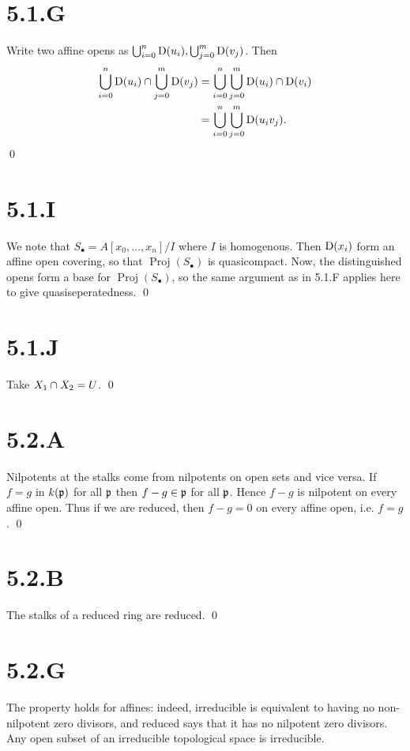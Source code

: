 \documentclass{article}
\begin{document}
\section{5.1.G}
Write two affine opens as $\bigcup_{i=0}^n \operatorname{D}(u_i), \bigcup_{j=0}^m \operatorname{D}(v_j)$. Then
\begin{align*}
    \bigcup_{i=0}^n \operatorname{D}(u_i) \cap \bigcup_{j=0}^m \operatorname{D}(v_j) & = \bigcup_{i=0}^n \bigcup_{j=0}^m \operatorname{D}(u_i) \cap \operatorname{D}(v_i) \\
                                                             & = \bigcup_{i=0}^n \bigcup_{j=0}^m \operatorname{D}(u_iv_j).
\end{align*}
\qed

\section{5.1.I}
We note that $S_{\bullet} = A[x_0, \dots, x_n]/I$ where $I$ is homogenous. Then $\operatorname{D}(x_i)$ form an affine open covering, so that $\operatorname{Proj}(S_{\bullet})$ is quasicompact. Now, the distinguished opens form a base for $\operatorname{Proj}(S_{\bullet})$, so the same argument as in 5.1.F applies here to give quasiseperatedness. \qed

\section{5.1.J}
Take $X_1 \cap X_2 = U$. \qed

\section{5.2.A}
Nilpotents at the stalks come from nilpotents on open sets and vice versa.
If $f=g$ in $k(\mathfrak{p})$ for all $\mathfrak{p}$ then $f-g \in \mathfrak{p}$ for all $\mathfrak{p}$. Hence $f-g$ is nilpotent on every affine open. Thus if we are reduced, then $f-g=0$ on every affine open, i.e. $f=g$. \qed

\section{5.2.B}
The stalks of a reduced ring are reduced. \qed

\section{5.2.G}
The property holds for affines: indeed, irreducible is equivalent to having no non-nilpotent zero divisors, and reduced says that it has no nilpotent zero divisors. Any open subset of an irreducible topological space is irreducible.
\end{document}

